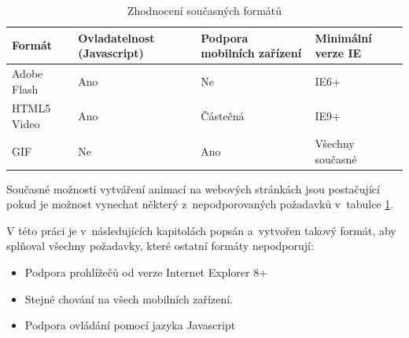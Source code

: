 \begin{table}[h]\centering\footnotesize
	\caption[analysisResult]{Zhodnocení současných formátů}\label{tab:research-result}
	\begin{tabular}{|l||m{2.5cm}|m{2.5cm}|m{2.5cm}|}
	\hline
		Formát & Ovladatelnost (Javascript) & Podpora mobilních zařízení & Minimální verze IE
		\tabularnewline \hline \hline 
		Adobe Flash  &  Ano & Ne & IE6+ \\ \hline
		HTML5 Video  &  Ano & Částečná & IE9+ \\ \hline
		GIF  &  Ne & Ano & Všechny současné
		\tabularnewline \hline
	\end{tabular}
\end{table}

Současné možnosti vytváření animací na webových stránkách jsou postačující pokud je možnost vynechat některý z~nepodporovaných požadavků v~tabulce \ref{tab:research-result}. 

V této práci je v~následujících kapitolách popsán a~vytvořen takový formát, aby splňoval všechny požadavky, které ostatní formáty nepodporují:

\begin{itemize}
\item Podpora prohlížečů od verze Internet Explorer 8+
\item Stejné chování na všech mobilních zařízení.
\item Podpora ovládání pomocí jazyka Javascript
\end{itemize}

